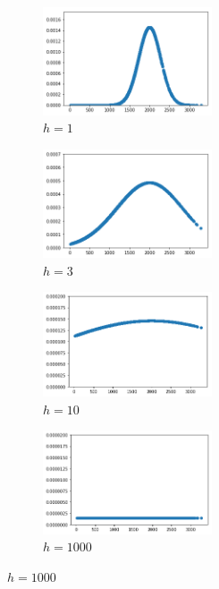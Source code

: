 \documentclass[12pt,a4paper]{article}
\begin{document}
\begin{center}
\begin{figure}[h]
 \caption{Gaussian Kernels for $\chi = 2000$}
  \begin{subfigure}{6cm}
    \centering\includegraphics[width=5cm]{gk1.png}
    \caption{$h = 1$}
  \end{subfigure}
  \begin{subfigure}{6cm}
    \centering\includegraphics[width=5cm]{gk3.png}
    \caption{$h = 3$}
  \end{subfigure}
 
  \begin{subfigure}{6cm}
    \centering\includegraphics[width=5cm]{gk10.png}
    \caption{$h = 10$}
  \end{subfigure}
  \begin{subfigure}{6cm}
    \centering\includegraphics[width=5cm]{gk1000.png}
    \caption{$h = 1000$}
  \end{subfigure}
\end{figure}
\end{center}
\end{document}
